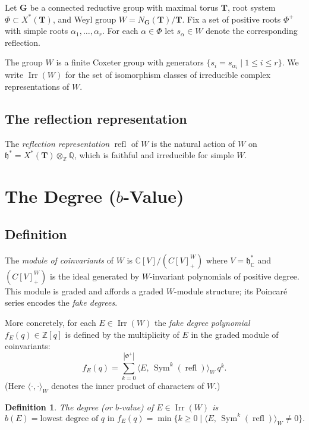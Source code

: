 \documentclass[12pt]{amsart}
\newtheorem{definition}[theorem]{Definition}
\newcommand{\Sym}{\operatorname{Sym}}
\newcommand{\refl}{\operatorname{refl}}
\newcommand{\Irr}{\operatorname{Irr}}
\newcommand{\ZZ}{\mathbb{Z}}
\newcommand{\QQ}{\mathbb{Q}}
\newcommand{\CC}{\mathbb{C}}
\newcommand{\bfG}{\mathbf{G}}
\newcommand{\bfT}{\mathbf{T}}
\begin{document}
Let $\bfG$ be a connected reductive group with maximal torus $\bfT$, root
system $\Phi \subset X^*(\bfT)$, and Weyl group $W = N_{\bfG}(\bfT)/\bfT$.
Fix a set of positive roots $\Phi^+$ with simple roots $\alpha_1,\ldots,
\alpha_r$.  For each $\alpha \in \Phi$ let $s_\alpha \in W$ denote the
corresponding reflection.

The group $W$ is a finite Coxeter group with generators $\{s_i = s_{\alpha_i}
\mid 1 \leq i \leq r\}$.  We write $\Irr(W)$ for the set of isomorphism
classes of irreducible complex representations of $W$.

\subsection{The reflection representation}

The \emph{reflection representation} $\refl$ of $W$ is the natural action of
$W$ on $\mathfrak{h}^* = X^*(\bfT) \otimes_\ZZ \QQ$, which is faithful and
irreducible for simple $W$.

\section{The Degree ($b$-Value)}

\subsection{Definition}

The \emph{module of coinvariants} of $W$ is $\CC[V] / (C[V]^W_+)$ where
$V = \mathfrak{h}^*_\CC$ and $(C[V]^W_+)$ is the ideal generated by
$W$-invariant polynomials of positive degree.  This module is graded and affords
a graded $W$-module structure; its Poincar\'e series encodes the
\emph{fake degrees}.

More concretely, for each $E \in \Irr(W)$ the \emph{fake degree polynomial}
$f_E(q) \in \ZZ[q]$ is defined by the multiplicity of $E$ in the graded module
of coinvariants:
\[
  f_E(q) = \sum_{k=0}^{|\Phi^+|} \langle E,\, \Sym^k(\refl) \rangle_W \, q^k.
\]
(Here $\langle \cdot, \cdot \rangle_W$ denotes the inner product of characters
of $W$.)

\begin{definition}
  The \emph{degree} (or \emph{$b$-value}) of $E \in \Irr(W)$ is
  \[
    b(E) = \text{lowest degree of } q \text{ in } f_E(q)
    = \min\{ k \geq 0 \mid \langle E,\, \Sym^k(\refl) \rangle_W \neq 0 \}.
  \]
\end{definition}
\end{document}

